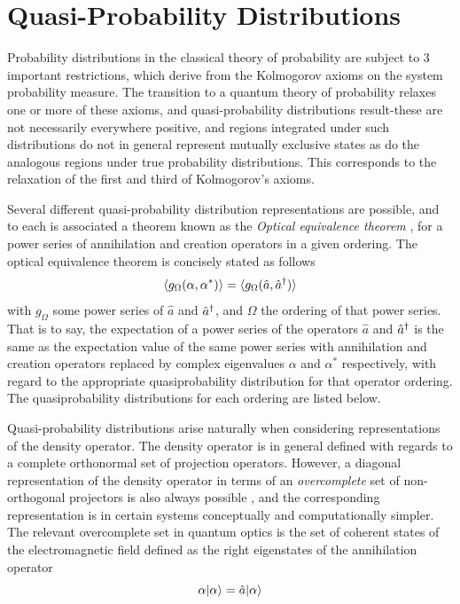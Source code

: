 \section{Quasi-Probability Distributions}
Probability distributions in the classical theory of probability are subject to 3 important restrictions, which derive from the Kolmogorov axioms on the system probability measure. The transition to a quantum theory of probability relaxes one or more of these axioms, and quasi-probability distributions result-these are not necessarily everywhere positive, and regions integrated under such distributions do not in general represent mutually exclusive states as do the analogous regions under true probability distributions. This corresponds to the relaxation of the first and third of Kolmogorov's axioms.

Several different quasi-probability distribution representations are possible\cite{Walls2008}, and to each is associated a theorem known as the \emph{Optical equivalence theorem} \cite{Sudarshan1963}, for a power series of annihilation and creation operators in a given ordering. The optical equivalence theorem is concisely stated as follows
\begin{equation}
	\langle g_{\Omega} (\alpha, \alpha^*) \rangle = \langle g_{\Omega} (\hat{a}, \hat{a}^\dagger) \rangle
\end{equation}
with $g_\Omega$ some power series of $\hat{a}$ and $\hat{a}^\dagger$, and $\Omega$ the ordering of that power series. That is to say, the expectation of a power series of the operators $\hat{a}$ and $\hat{a}^\dagger$ is the same as the expectation value of the same power series with annihilation and creation operators replaced by complex eigenvalues $\alpha$ and $\alpha^*$ respectively, with regard to the appropriate quasiprobability distribution for that operator ordering. The quasiprobability distributions for each ordering are listed below.

Quasi-probability distributions arise naturally when considering representations of the density operator. The density operator is in general defined with regards to a complete orthonormal set of projection operators. However, a diagonal representation of the density operator in terms of an \emph{overcomplete} set of non-orthogonal projectors is also always possible \cite{Sudarshan1963}, and the corresponding representation is in certain systems conceptually and computationally simpler. The relevant overcomplete set in quantum optics is the set of coherent states of the electromagnetic field defined as the right eigenstates of the annihilation operator
\begin{equation}
\alpha | \alpha \rangle = \hat{a} | \alpha \rangle
\end{equation}
